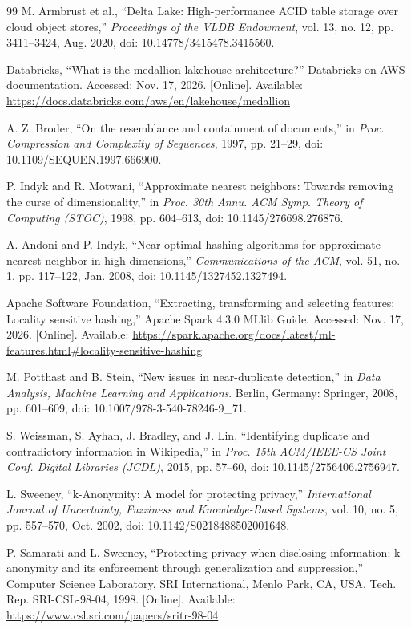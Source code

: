 \begin{thebibliography}{99}
M. Armbrust et al., ``Delta Lake: High-performance ACID table storage over cloud object stores,'' \emph{Proceedings of the VLDB Endowment}, vol. 13, no. 12, pp. 3411--3424, Aug. 2020, doi: 10.14778/3415478.3415560.

Databricks, ``What is the medallion lakehouse architecture?'' Databricks on AWS documentation. Accessed: Nov. 17, 2026. [Online]. Available: \url{https://docs.databricks.com/aws/en/lakehouse/medallion}

A. Z. Broder, ``On the resemblance and containment of documents,'' in \emph{Proc. Compression and Complexity of Sequences}, 1997, pp. 21--29, doi: 10.1109/SEQUEN.1997.666900.

P. Indyk and R. Motwani, ``Approximate nearest neighbors: Towards removing the curse of dimensionality,'' in \emph{Proc. 30th Annu. ACM Symp. Theory of Computing (STOC)}, 1998, pp. 604--613, doi: 10.1145/276698.276876.

A. Andoni and P. Indyk, ``Near-optimal hashing algorithms for approximate nearest neighbor in high dimensions,'' \emph{Communications of the ACM}, vol. 51, no. 1, pp. 117--122, Jan. 2008, doi: 10.1145/1327452.1327494.

Apache Software Foundation, ``Extracting, transforming and selecting features: Locality sensitive hashing,'' Apache Spark 4.3.0 MLlib Guide. Accessed: Nov. 17, 2026. [Online]. Available: \url{https://spark.apache.org/docs/latest/ml-features.html#locality-sensitive-hashing}

M. Potthast and B. Stein, ``New issues in near-duplicate detection,'' in \emph{Data Analysis, Machine Learning and Applications}. Berlin, Germany: Springer, 2008, pp. 601--609, doi: 10.1007/978-3-540-78246-9\_71.

S. Weissman, S. Ayhan, J. Bradley, and J. Lin, ``Identifying duplicate and contradictory information in Wikipedia,'' in \emph{Proc. 15th ACM/IEEE-CS Joint Conf. Digital Libraries (JCDL)}, 2015, pp. 57--60, doi: 10.1145/2756406.2756947.

L. Sweeney, ``k-Anonymity: A model for protecting privacy,'' \emph{International Journal of Uncertainty, Fuzziness and Knowledge-Based Systems}, vol. 10, no. 5, pp. 557--570, Oct. 2002, doi: 10.1142/S0218488502001648.

P. Samarati and L. Sweeney, ``Protecting privacy when disclosing information: k-anonymity and its enforcement through generalization and suppression,'' Computer Science Laboratory, SRI International, Menlo Park, CA, USA, Tech. Rep. SRI-CSL-98-04, 1998. [Online]. Available: \url{https://www.csl.sri.com/papers/sritr-98-04}


\end{thebibliography}

